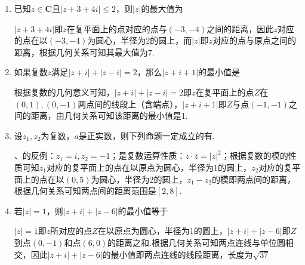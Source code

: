 \begin{enumerate}
\begin{enumerate}
\begin{jieda}
        $|z - 25i| \leq 15, z \in \mathbf{C}$即$z$在复平面上对应的点$Z$在以$(0, 25)$为圆心，半径为15的圆内（包含边界），而$|z|$是$Z$到原点的距离，故根据几何关系显然有$|z|$最小时$z = 10i$，$|z|$最大时$z = 40i$.
    \end{jieda}
    \item 已知$z \in \mathbf{C}$且$|z + 3 + 4i| \leq 2$，则$|z|$的最大值为
    \begin{jieda}
        $|z + 3 + 4i|$即$z$在复平面上的点对应的点与$(-3, -4)$之间的距离，因此$z$对应的点在以$(-3, -4)$为圆心，半径为2的圆上，而$|z|$即$z$对应的点与原点之间的距离，根据几何关系可知其最大值为7.
    \end{jieda}
    \item 如果复数$z$满足$|z+i| + |z-i| = 2$，那么$|z+i+1|$的最小值是
    \begin{jieda}
        根据复数的几何意义可知，$|z+i| + |z-i| = 2$即$z$在复平面上的点$Z$在$(0, 1), (0, -1)$两点间的线段上（含端点），$|z+i+1|$即$Z$与点$(-1, -1)$之间的距离，由几何关系可知该距离的最小值是1.
    \end{jieda}
    \item 设$z_1, z_2$为复数，$a$是正实数，则下列命题一定成立的有.
    \begin{jieda}
        、的反例：$z_1 = i, z_2 = -1$；是复数运算性质：$z \cdot \overline{z} = |z|^2$；根据复数的模的性质可知$z_1$对应的复平面上的点在以原点为圆心，半径为1的圆上，$z_2$对应的复平面上的点在以$(0, 5)$为圆心，半径为2的圆上，$z_1 - z_2$的模即两点间的距离，根据几何关系可知两点间的距离范围是$[2, 8]$.
    \end{jieda}
    \item 若$|z| = 1$，则$|z+i|+|z-6|$的最小值等于
    \begin{jieda}
        $|z| = 1$即$z$所对应的点$Z$在以原点为圆心，半径为1的圆上，$|z+i|+|z-6|$即$Z$到点$(0, -1)$和点$(6,0)$的距离之和.根据几何关系可知两点连线与单位圆相交，因此$|z+i|+|z-6|$的最小值即两点连线的线段距离，长度为$\sqrt{37}$

\end{jieda}
\end{enumerate}
\end{enumerate}
